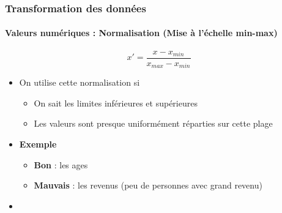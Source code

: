 \documentclass[xcolor=table]{beamer}
\begin{document}
\begin{frame}
	\frametitle{Transformation des données}
	\framesubtitle{Valeurs numériques : Normalisation (Mise à l'échelle min-max)}
	
	\[x' = \frac{x - x_{min}}{x_{max} - x_{min}}\]
	
	\begin{itemize}
		\item On utilise cette normalisation si
		\begin{itemize}
			\item On sait les limites inférieures et supérieures
			\item Les valeurs sont presque uniformément réparties sur cette plage
		\end{itemize}
		\item \textbf{Exemple}
		\begin{itemize}
			\item \textbf{Bon} : les ages
			\item \textbf{Mauvais} : les revenus (peu de personnes avec grand revenu)
		\end{itemize}
		\item {}
	\end{itemize}
	
\end{frame}
\end{document}
